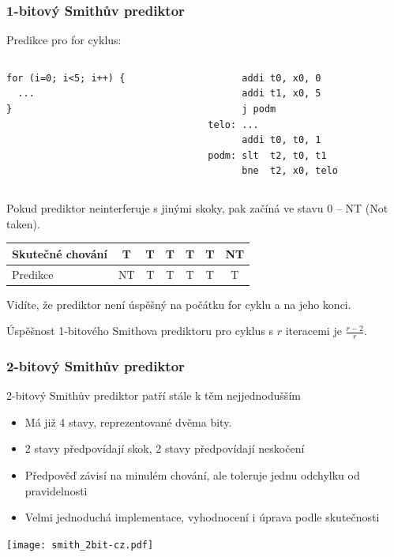 \documentclass{beamer}
\begin{document}
\begin{frame}[fragile]
\frametitle{1-bitový Smithův prediktor}

Predikce pro for cyklus:

\begin{columns}[T]
\begin{column}{0.35\textwidth}
\begin{verbatim}
for (i=0; i<5; i++) {
  ...
}
\end{verbatim}
\end{column}
\hfill
\begin{column}{0.45\textwidth}
\begin{verbatim}
      addi t0, x0, 0
      addi t1, x0, 5
      j podm
telo: ...
      addi t0, t0, 1
podm: slt  t2, t0, t1
      bne  t2, x0, telo
\end{verbatim}
\end{column}
\end{columns}
\bigskip
Pokud prediktor neinterferuje s jinými skoky, pak začíná ve stavu 0 -- NT (Not taken).

\begin{tabular}{|l|c|c|c|c|c|c|}\hline
Skutečné chování & T & T & T & T & T & NT\\ \hline
Predikce         & {\color{red}NT} & T & T & T & T & {\color{red}T}\\ \hline
\end{tabular}

Vidíte, že prediktor není úspěšný na počátku for cyklu a na jeho konci.

Úspěšnost 1-bitového Smithova prediktoru pro cyklus s $r$ iteracemi je $\frac{r-2}{r}$.
\end{frame}


\begin{frame}
\frametitle{2-bitový Smithův prediktor}

2-bitový Smithův prediktor patří stále k těm nejjednodušším
\begin{itemize}
\item Má již 4 stavy, reprezentované dvěma bity.
\item 2 stavy předpovídají skok, 2 stavy předpovídají neskočení
\item Předpověď závisí na minulém chování, ale toleruje jednu odchylku od pravidelnosti
\item Velmi jednoduchá implementace, vyhodnocení i úprava podle skutečnosti
\end{itemize}

\begin{center}
\texttt{[image: smith\_2bit-cz.pdf]}
\end{center}
\end{frame}
\end{document}
